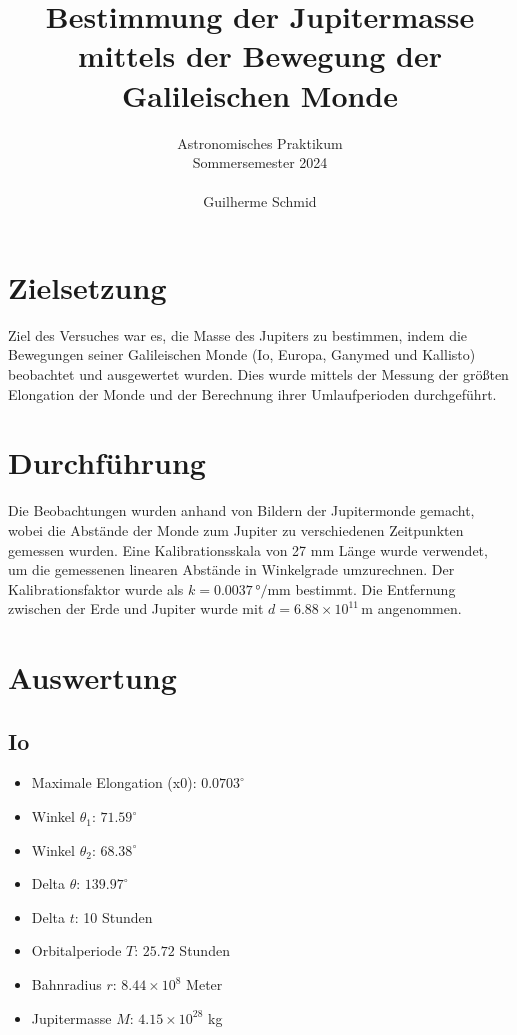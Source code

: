 \documentclass[a4paper,12pt]{article}
\title{Bestimmung der Jupitermasse mittels der Bewegung der Galileischen Monde}
\author{Astronomisches Praktikum \\
Sommersemester 2024\\\\
Guilherme Schmid}
\date{}
\begin{document}
\maketitle

\section*{Zielsetzung}
Ziel des Versuches war es, die Masse des Jupiters zu bestimmen, indem die Bewegungen seiner Galileischen Monde (Io, Europa, Ganymed und Kallisto) beobachtet und ausgewertet wurden. Dies wurde mittels der Messung der größten Elongation der Monde und der Berechnung ihrer Umlaufperioden durchgeführt.

\section*{Durchführung}
Die Beobachtungen wurden anhand von Bildern der Jupitermonde gemacht, wobei die Abstände der Monde zum Jupiter zu verschiedenen Zeitpunkten gemessen wurden. Eine Kalibrationsskala von 27 mm Länge wurde verwendet, um die gemessenen linearen Abstände in Winkelgrade umzurechnen. Der Kalibrationsfaktor wurde als \( k = 0.0037 \, \text{°/mm} \) bestimmt. Die Entfernung zwischen der Erde und Jupiter wurde mit \( d = 6.88 \times 10^{11} \, \text{m} \) angenommen.

\section*{Auswertung}
\subsection*{Io}
\begin{itemize}
    \item Maximale Elongation (x0): \( 0.0703^\circ \)
    \item Winkel \(\theta_1\): \( 71.59^\circ \)
    \item Winkel \(\theta_2\): \( 68.38^\circ \)
    \item Delta \(\theta\): \( 139.97^\circ \)
    \item Delta \(t\): 10 Stunden
    \item Orbitalperiode \(T\): \( 25.72 \) Stunden
    \item Bahnradius \(r\): \( 8.44 \times 10^8 \) Meter
    \item Jupitermasse \(M\): \( 4.15 \times 10^{28} \) kg
\end{itemize}
\end{document}
